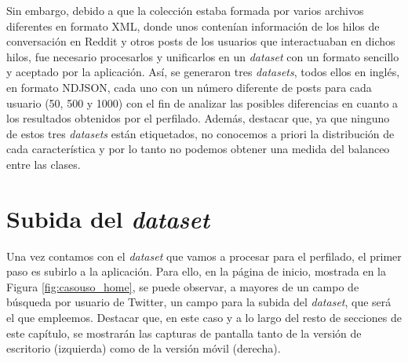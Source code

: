 \bigskip
Sin embargo, debido a que la colección estaba formada por varios archivos diferentes en formato XML, donde unos contenían información de los hilos
de conversación en Reddit y otros posts de los usuarios que interactuaban en dichos hilos, fue necesario procesarlos y unificarlos
en un \textit{dataset} con un formato sencillo y aceptado por la aplicación. Así, se generaron tres \textit{datasets}, todos ellos
en inglés, en formato NDJSON, cada uno con 
un número diferente de posts para cada usuario (50, 500 y 1000) con el fin de analizar las posibles diferencias en cuanto a los resultados
obtenidos por el perfilado. Además, destacar que, ya que ninguno de estos tres \textit{datasets} están etiquetados, no conocemos a priori 
la distribución de cada característica y por lo tanto no podemos obtener una medida del balanceo entre las clases.

\section{Subida del \textit{dataset}}
\label{sec:casouso_subida_dataset}

Una vez contamos con el \textit{dataset} que vamos a procesar para el perfilado, el primer paso es subirlo a la aplicación. Para ello,
en la página de inicio, mostrada en la Figura \ref{fig:casouso_home}, se puede observar, a mayores de un
campo de búsqueda por usuario de Twitter, un campo para la subida del \textit{dataset}, que será el que empleemos.
Destacar que, en este caso y a lo largo del resto de secciones de este capítulo,
se mostrarán las capturas de pantalla tanto de la versión de escritorio (izquierda) como de la versión móvil (derecha).


